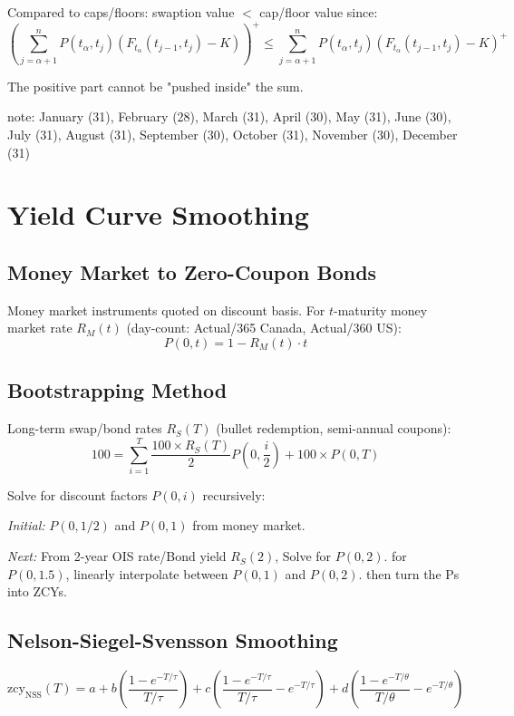 \documentclass[12pt,a4paper]{article}
\begin{document}
Compared to caps/floors: swaption value $<$ cap/floor value since:
$$\left(\sum_{j=\alpha+1}^{n} P(t_\alpha, t_j)(F_{t_\alpha}(t_{j-1}, t_j) - K)\right)^+ \leq \sum_{j=\alpha+1}^{n} P(t_\alpha, t_j)(F_{t_\alpha}(t_{j-1}, t_j) - K)^+$$

The positive part cannot be "pushed inside" the sum.

\vspace{0.5em}

note: January (31), February (28), March (31), April (30), May (31), June (30), July (31), August (31), September (30), October (31), November (30), December (31)
\section{Yield Curve Smoothing}

\subsection{Money Market to Zero-Coupon Bonds}

Money market instruments quoted on discount basis. For $t$-maturity money market rate $R_M(t)$ (day-count: Actual/365 Canada, Actual/360 US):
$$P(0,t) = 1 - R_M(t) \cdot t$$

\subsection{Bootstrapping Method}

Long-term swap/bond rates $R_S(T)$ (bullet redemption, semi-annual coupons):
$$100 = \sum_{i=1}^{T} \frac{100 \times R_S(T)}{2} P\left(0, \frac{i}{2}\right) + 100 \times P(0, T)$$

Solve for discount factors $P(0,i)$ recursively:

\textit{Initial:} $P(0, 1/2)$ and $P(0,1)$ from money market.

\textit{Next:} From 2-year OIS rate/Bond yield $R_S(2)$, Solve for $P(0,2)$. for $P(0,1.5)$, linearly interpolate between $P(0,1)$ and $P(0,2)$.
then turn the Ps into ZCYs.

\subsection{Nelson-Siegel-Svensson Smoothing}

$$\text{zcy}_{\text{NSS}}(T) = a + b\left(\frac{1 - e^{-T/\tau}}{T/\tau}\right) + c\left(\frac{1 - e^{-T/\tau}}{T/\tau} - e^{-T/\tau}\right) + d\left(\frac{1 - e^{-T/\theta}}{T/\theta} - e^{-T/\theta}\right)$$
\end{document}
